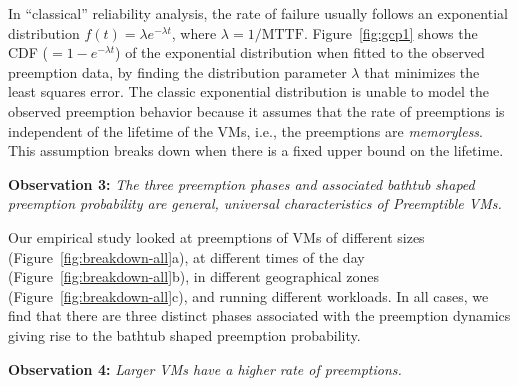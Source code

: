 \noindent In ``classical'' reliability analysis, the rate of failure  usually follows an exponential distribution $f(t) = \lambda e^{-\lambda t}$, where $\lambda=1/\text{MTTF}$.
Figure~\ref{fig:gcp1} shows the CDF ($=1-e^{-\lambda t}$) of the exponential distribution when fitted to the observed preemption data, by finding the distribution parameter $\lambda$ that minimizes the least squares error.
The classic exponential distribution is unable to model the observed preemption behavior because it assumes that the rate of preemptions is independent of the lifetime of the VMs, i.e., the preemptions are \emph{memoryless}.
This assumption breaks down when there is a fixed upper bound on the lifetime. %

\noindent \textbf{Observation 3:} \emph{The three preemption phases and associated bathtub shaped preemption probability are general, universal characteristics of Preemptible VMs.}

Our empirical study looked at preemptions of VMs of different sizes (Figure~\ref{fig:breakdown-all}a), at different times of the day (Figure~\ref{fig:breakdown-all}b), in different geographical zones (Figure~\ref{fig:breakdown-all}c), and running different workloads. 
In all cases, we find that there are three distinct phases associated with the preemption dynamics giving rise to the bathtub shaped preemption probability. 


\noindent \textbf{Observation 4:}\emph{ Larger VMs have a higher rate of preemptions.}

